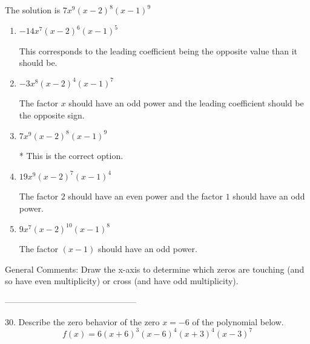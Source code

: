 \documentclass{article}[14pt]
\begin{document}
The solution is $ 7x^{9} (x - 2)^{8} (x - 1)^{9} $ 

\begin{enumerate}[label=\Alph*.] 
\item $ -14x^{7} (x - 2)^{6} (x - 1)^{5} $ 

 This corresponds to the leading coefficient being the opposite value than it should be. 
\item $ -3x^{8} (x - 2)^{4} (x - 1)^{7} $ 

 The factor $x$ should have an odd power and the leading coefficient should be the opposite sign. 
\item $ 7x^{9} (x - 2)^{8} (x - 1)^{9} $ 

 * This is the correct option. 
\item $ 19x^{9} (x - 2)^{7} (x - 1)^{4} $ 

 The factor $2$ should have an even power and the factor $1$ should have an odd power. 
\item $ 9x^{7} (x - 2)^{10} (x - 1)^{8} $ 

 The factor $(x - 1)$ should have an odd power. 
\end{enumerate} 
 
General Comments: Draw the x-axis to determine which zeros are touching (and so have even multiplicity) or cross (and have odd multiplicity).

-----------------------------------------------

30. Describe the zero behavior of the zero $x = -6$ of the polynomial below.
$$ f(x) = 6(x + 6)^{3}(x - 6)^{4}(x + 3)^{4}(x - 3)^{7} $$ 
\end{document}
